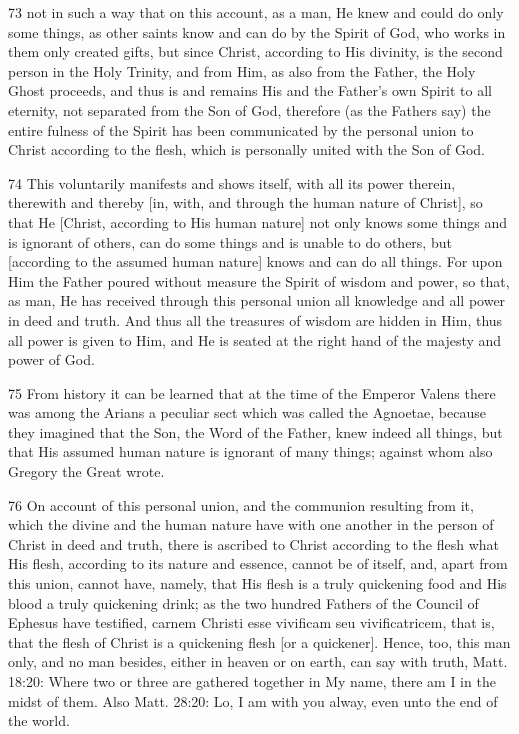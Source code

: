 {73 not in such a way that on this account, as a man, He knew and could do only some things, as other saints know and can do by the Spirit of God, who works in them only created gifts, but since Christ, according to His divinity, is the second person in the Holy Trinity, and from Him, as also from the Father, the Holy Ghost proceeds, and thus is and remains His and the Father’s own Spirit to all eternity, not separated from the Son of God, therefore (as the Fathers say) the entire fulness of the Spirit has been communicated by the personal union to Christ according to the flesh, which is personally united with the Son of God.

74 This voluntarily manifests and shows itself, with all its power therein, therewith and thereby [in, with, and through the human nature of Christ], so that He [Christ, according to His human nature] not only knows some things and is ignorant of others, can do some things and is unable to do others, but [according to the assumed human nature] knows and can do all things. For upon Him the Father poured without measure the Spirit of wisdom and power, so that, as man, He has received through this personal union all knowledge and all power in deed and truth. And thus all the treasures of wisdom are hidden in Him, thus all power is given to Him, and He is seated at the right hand of the majesty and power of God.

75 From history it can be learned that at the time of the Emperor Valens there was among the Arians a peculiar sect which was called the Agnoetae, because they imagined that the Son, the Word of the Father, knew indeed all things, but that His assumed human nature is ignorant of many things; against whom also Gregory the Great wrote.

76 On account of this personal union, and the communion resulting from it, which the divine and the human nature have with one another in the person of Christ in deed and truth, there is ascribed to Christ according to the flesh what His flesh, according to its nature and essence, cannot be of itself, and, apart from this union, cannot have, namely, that His flesh is a truly quickening food and His blood a truly quickening drink; as the two hundred Fathers of the Council of Ephesus have testified, carnem Christi esse vivificam seu vivificatricem, that is, that the flesh of Christ is a quickening flesh [or a quickener]. Hence, too, this man only, and no man besides, either in heaven or on earth, can say with truth, Matt. 18:20: Where two or three are gathered together in My name, there am I in the midst of them. Also Matt. 28:20: Lo, I am with you alway, even unto the end of the world.

}
